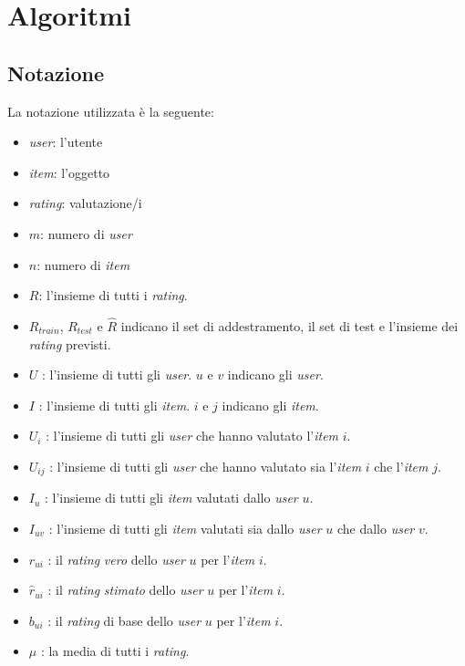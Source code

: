 \chapter{Algoritmi}\label{algoritmi}

\section{Notazione}\label{notazione}

La notazione utilizzata è la seguente:

\begin{itemize}
    \item \textit{user}: l'utente
    \item \textit{item}: l'oggetto
    \item \textit{rating}: valutazione/i
    \item $m$: numero di \textit{user}
    \item $n$: numero di \textit{item}
    \item $R$: l'insieme di tutti i \textit{rating}.
    \item $R_{train}$, $R_{test}$ e $\hat{R}$ indicano il set di addestramento, il set di test e l'insieme dei \textit{rating} previsti.
    \item $U$ : l'insieme di tutti gli \textit{user}. $u$ e $v$ indicano gli \textit{user}.
    \item $I$ : l'insieme di tutti gli \textit{item}. $i$ e $j$ indicano gli \textit{item}.
    \item $U_i$ : l'insieme di tutti gli \textit{user} che hanno valutato l'\textit{item} $i$.
    \item $U_{ij}$ : l'insieme di tutti gli \textit{user} che hanno valutato sia l'\textit{item} $i$ che l'\textit{item} $j$.
    \item $I_u$ : l'insieme di tutti gli \textit{item} valutati dallo \textit{user} $u$.
    \item $I_{uv}$ : l'insieme di tutti gli \textit{item} valutati sia dallo \textit{user} $u$ che dallo \textit{user} $v$.
    \item $r_{ui}$ : il \textit{rating} \textit{vero} dello \textit{user} $u$ per l'\textit{item} $i$.
    \item $\hat{r}_{ui}$ : il \textit{rating} \textit{stimato} dello \textit{user} $u$ per l'\textit{item} $i$.
    \item $b_{ui}$ : il \textit{rating} di base dello \textit{user} $u$ per l'\textit{item} $i$.
    \item $\mu$ : la media di tutti i \textit{rating}.

\end{itemize}
